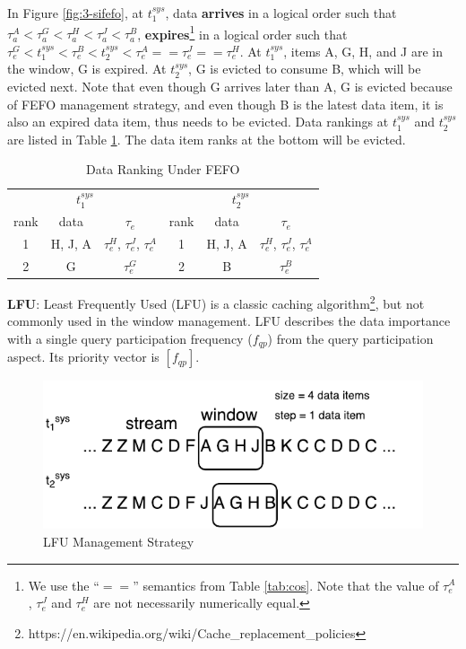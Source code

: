 In Figure \ref{fig:3-sifefo}, at $t^{sys}_{1}$, data \textbf{arrives} in a logical order such that $\tau^{A}_{a} < \tau^{G}_{a} < \tau^{H}_{a} < \tau^{J}_{a} < \tau^{B}_{a}$, \textbf{expires}\footnote{We use the ``$==$'' semantics from Table \ref{tab:cos}. Note that the value of $\tau^{A}_{e}$, $\tau^{J}_{e}$ and $\tau^{H}_{e}$ are not necessarily numerically equal.} in a logical order such that $\tau^{G}_{e} < t^{sys}_{1} < \tau^{B}_{e} < t^{sys}_{2} < \tau^{A}_{e} == \tau^{J}_{e} == \tau^{H}_{e}$.
At $t^{sys}_{1}$, items A, G, H, and J are in the window, G is expired.
At $t^{sys}_{2}$, G is evicted to consume B, which will be evicted next. 
Note that even though G arrives later than A, G is evicted because of FEFO management strategy,
and even though B is the latest data item, it is also an expired data item, thus needs to be evicted. 
Data rankings at $t^{sys}_{1}$ and $t^{sys}_{2}$ are listed in Table \ref{tab:fefo}. 
The data item ranks at the bottom will be evicted. 

\begin{table}[!htbp]
\centering
\caption{Data Ranking Under FEFO}
\label{tab:fefo}
\begin{tabular}{|c|c|c||c|c|c|}
\hline
\multicolumn{3}{|c||}{$t^{sys}_{1}$} & \multicolumn{3}{c|}{$t^{sys}_{2}$} \\ \hhline{|======|}
rank & data & $\tau_{e}$ & rank & data & $\tau_{e}$ \\ \hhline{|=|=|=#=|=|=|}
1 & H, J, A & $\tau^{H}_{e}$, $\tau^{J}_{e}$, $\tau^{A}_{e}$ & 1 & H, J, A & $\tau^{H}_{e}$, $\tau^{J}_{e}$, $\tau^{A}_{e}$ \\ \hline
2 & G & $\tau^{G}_{e}$ & 2 & B & $\tau^{B}_{e}$ \\ \hline
\end{tabular}
\end{table}

\textbf{LFU}:
Least Frequently Used (LFU) is a classic caching algorithm\footnote{https://en.wikipedia.org/wiki/Cache\_replacement\_policies}, but not commonly used in the window management.
LFU describes the data importance with a single query participation frequency ($f_{qp}$) from the query participation aspect. 
Its priority vector is $[f_{qp}]$.

\begin{figure}[!htbp]
	\centering
    \includegraphics[width=5in]{img/3-silfu.pdf}
    \caption{LFU Management Strategy}
    \label{fig:3-silfu}
\end{figure}

